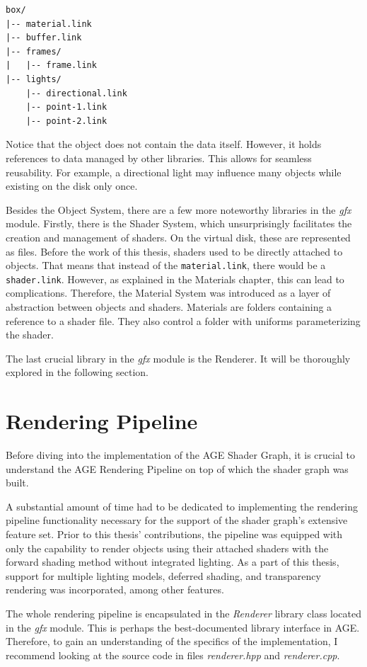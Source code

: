 \documentclass[
  digital,     %
  oneside,     %
  nosansbold,  %
  nocolorbold, %
  lof,         %
  lot,         %
]{fithesis4}
\begin{document}
\begin{verbatim}
box/
|-- material.link
|-- buffer.link
|-- frames/
|   |-- frame.link
|-- lights/
    |-- directional.link
    |-- point-1.link
    |-- point-2.link
\end{verbatim}


Notice that the object does not contain the data itself. However, it holds references to data managed by other
libraries. This allows for seamless reusability. For example, a directional light may influence many objects
while existing on the disk only once.

Besides the Object System, there are a few more noteworthy libraries in the \textit{gfx} module.
Firstly, there is the Shader System, which unsurprisingly facilitates the creation and management
of shaders. On the virtual disk, these are represented as files.
Before the work of this thesis, shaders used to be directly attached to objects.
That means that instead of the \verb|material.link|, there would be a \verb|shader.link|.
However, as explained in the Materials chapter, this can lead to complications. Therefore,
the Material System was introduced as a layer of abstraction between objects and shaders.
Materials are folders containing a reference to a shader file. They also control a folder with uniforms
parameterizing the shader.

The last crucial library in the \textit{gfx} module is the Renderer. It will be thoroughly explored
in the following section.

\section{Rendering Pipeline}
Before diving into the implementation of the AGE Shader Graph, it is crucial to understand
the AGE Rendering Pipeline on top of which the shader graph was built.

A substantial amount of time had to be dedicated to implementing the rendering pipeline functionality
necessary for the support of the shader graph's extensive feature set.
Prior to this thesis' contributions,
the pipeline was equipped with only the capability to render objects using their attached shaders
with the forward shading method without integrated lighting. As a part of this thesis, support for multiple lighting models,
deferred shading, and transparency rendering was incorporated, among other features.

The whole rendering pipeline is encapsulated in the \textit{Renderer} library class located
in the \textit{gfx} module. This is perhaps the best-documented library interface in AGE.
Therefore, to gain an understanding of the specifics of the implementation,
I recommend looking at the source code in files \textit{renderer.hpp} and \textit{renderer.cpp}.
\end{document}
